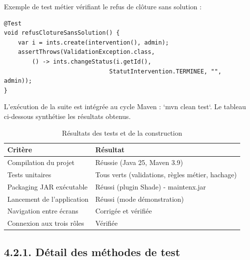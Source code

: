 \documentclass[11pt,a4paper]{report}
\begin{document}
Exemple de test métier vérifiant le refus de clôture sans solution :
\begin{lstlisting}
@Test
void refusClotureSansSolution() {
    var i = ints.create(intervention(), admin);
    assertThrows(ValidationException.class,
        () -> ints.changeStatus(i.getId(),
                              StatutIntervention.TERMINEE, "", admin));
}
\end{lstlisting}

L'exécution de la suite est intégrée au cycle Maven : `mvn clean test`. Le tableau ci-dessous synthétise les résultats obtenus.
\begin{table}[htbp]\centering\small
\begin{tabularx}{\textwidth}{|p{3.8cm}|X|}
\hline\rowcolor{hdr}\textbf{Critère} & \textbf{Résultat}\\ \hline
Compilation du projet & Réussie (Java 25, Maven 3.9)\\ \hline
Tests unitaires & Tous verts (validations, règles métier, hachage)\\ \hline
Packaging JAR exécutable & Réussi (plugin Shade) - maintenx.jar\\ \hline
Lancement de l'application & Réussi (mode démonstration)\\ \hline
Navigation entre écrans & Corrigée et vérifiée\\ \hline
Connexion aux trois rôles & Vérifiée\\ \hline
\end{tabularx}
\caption{Résultats des tests et de la construction}
\end{table}
\subsection*{4.2.1. Détail des méthodes de test}
\end{document}
